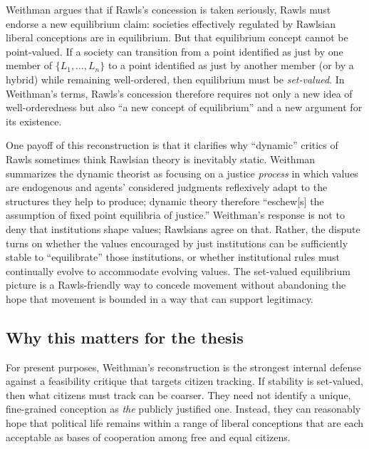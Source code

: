 \documentclass[12pt]{report}
\begin{document}
Weithman argues that if Rawls’s concession is taken seriously, Rawls must endorse a new equilibrium claim: societies effectively regulated by Rawlsian liberal conceptions are in equilibrium. \parencite[p.~206]{Weithman2023FixedPoints} But that equilibrium concept cannot be point-valued. If a society can transition from a point identified as just by one member of $\{L_{1},\ldots,L_{n}\}$ to a point identified as just by another member (or by a hybrid) while remaining well-ordered, then equilibrium must be \emph{set-valued}. \parencite[p.~206]{Weithman2023FixedPoints} In Weithman’s terms, Rawls’s concession therefore requires not only a new idea of well-orderedness but also ``a new concept of equilibrium'' and a new argument for its existence. \parencite[p.~206]{Weithman2023FixedPoints}

One payoff of this reconstruction is that it clarifies why ``dynamic'' critics of Rawls sometimes think Rawlsian theory is inevitably static. Weithman summarizes the dynamic theorist as focusing on a justice \emph{process} in which values are endogenous and agents’ considered judgments reflexively adapt to the structures they help to produce; dynamic theory therefore ``eschew[s] the assumption of fixed point equilibria of justice.'' \parencite[p.~207]{Weithman2023FixedPoints} Weithman’s response is not to deny that institutions shape values; Rawlsians agree on that. Rather, the dispute turns on whether the values encouraged by just institutions can be sufficiently stable to ``equilibrate'' those institutions, or whether institutional rules must continually evolve to accommodate evolving values. \parencite[p.~207]{Weithman2023FixedPoints} The set-valued equilibrium picture is a Rawls-friendly way to concede movement without abandoning the hope that movement is bounded in a way that can support legitimacy.

\subsection{Why this matters for the thesis}

For present purposes, Weithman’s reconstruction is the strongest internal defense against a feasibility critique that targets citizen tracking. If stability is set-valued, then what citizens must track can be coarser. They need not identify a unique, fine-grained conception as \emph{the} publicly justified one. Instead, they can reasonably hope that political life remains within a range of liberal conceptions that are each acceptable as bases of cooperation among free and equal citizens.
\end{document}
